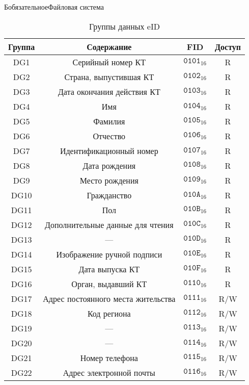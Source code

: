 \begin{appendix}{Б}{обязательное}{Файловая система}
\begin{table}[thb]
\caption{Группы данных eID}
\label{Table.FILES.DG}
\begin{tabular}{|c|c|c|c|}
\hline
Группа & Содержание & FID & Доступ\\
\hline
\hline
DG1 & Серийный номер КТ & 
$\texttt{0101}_{16}$ & R\\
DG2 & Страна, выпустившая КТ & 
$\texttt{0102}_{16}$ & R\\
DG3 & Дата окончания действия КТ & 
$\texttt{0103}_{16}$ & R\\
DG4 & Имя & 
$\texttt{0104}_{16}$ & R\\
DG5 & Фамилия & 
$\texttt{0105}_{16}$ & R\\
DG6 & Отчество & 
$\texttt{0106}_{16}$ & R\\
DG7 & Идентификационный номер & 
$\texttt{0107}_{16}$ & R\\
DG8 & Дата рождения & 
$\texttt{0108}_{16}$ & R\\
DG9 & Место рождения & 
$\texttt{0109}_{16}$ & R\\
DG10 & Гражданство & 
$\texttt{010A}_{16}$ & R\\
DG11 & Пол & 
$\texttt{010B}_{16}$ & R\\
DG12 & Дополнительные данные для чтения & 
$\texttt{010C}_{16}$ & R\\
DG13 & 
--- &
$\texttt{010D}_{16}$ & R\\
DG14 & Изображение ручной подписи & 
$\texttt{010E}_{16}$ & R\\
DG15 & Дата выпуска КТ & 
$\texttt{010F}_{16}$ & R\\
DG16 & Орган, выдавший КТ &  
$\texttt{0110}_{16}$ & R\\
DG17 & 	Адрес постоянного места жительства & 
$\texttt{0111}_{16}$ & R/W\\
DG18 & 	Код региона & 
$\texttt{0112}_{16}$ & R/W\\
DG19 & 	
--- &
$\texttt{0113}_{16}$ & R/W\\
DG20 & 	
--- &
$\texttt{0114}_{16}$ & R/W\\
DG21 & 	Номер телефона & 
$\texttt{0115}_{16}$ & R/W\\
DG22 & 	Адрес электронной почты & 
$\texttt{0116}_{16}$ & R/W\\
\hline
\end{tabular}
\end{table}



\end{appendix}
